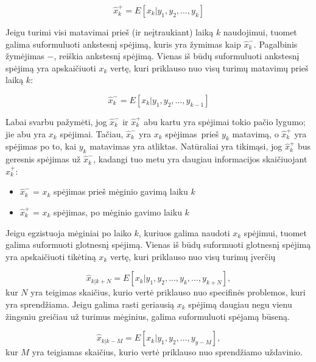     \begin{equation}
        \hat{x}_k^{+} = E[x_k|y_1,y_2, \dots , y_k]
    \end{equation}

    Jeigu turimi visi matavimai prieš (ir neįtraukiant) laiką $k$ naudojimui, tuomet galima suformuluoti ankstesnį spėjimą, kuris yra žymimas kaip $\hat{x}_k^{-}$.
    Pagalbinis žymėjimas $-$, reiškia ankstesnį spėjimą.
    Vienas iš būdų suformuluoti ankstesnį spėjimą yra apskaičiuoti $x_k$ vertę, kuri priklauso nuo visų turimų matavimų prieš laiką $k$:

    \begin{equation}
        \hat{x}_k^{-} = E[x_k|y_1,y_2,\dots, y_{k-1}]
    \end{equation}

    Labai svarbu pažymėti, jog $\hat{x}^-_k$ ir $\hat{x}_k^{+}$ abu kartu yra spėjimai tokio pačio lygumo; jie abu yra $x_k$ spėjimai.
    Tačiau, $\hat{x}_k^-$ yra $x_k$ spėjimas prieš $y_k$ matavimą, o $\hat{x}_k^+$ yra spėjimas po to, kai $y_k$ matavimas yra atliktas.
    Natūraliai yra tikimąsi, jog $\hat{x}_k^+$ bus geresnis spėjimas už $\hat{x}_k^-$, kadangi tuo metu yra daugiau informacijos skaičiuojant $\hat{x}_k^+$:

    \begin{itemize}
        \item $\hat{x}_k^-$ = $x_k$ spėjimas prieš mėginio gavimą laiku $k$
        \item $\hat{x}_k^+$ = $x_k$ spėjimas, po mėginio gavimo laiku $k$
    \end{itemize}

    Jeigu egzistuoja mėginiai po laiko $k$, kuriuos galima naudoti $x_k$ spėjimui, tuomet galima suformuoti glotnesnį spėjimą.
    Vienas iš būdų suformuoti glotnesnį spėjimą yra apskaičiuoti tikėtiną $x_k$ vertę, kuri priklauso nuo visų turimų įverčių

    \begin{equation}
        \hat{x}_{k|k+N} = E[x_k|y_1,y_2,\dots,y_k,\dots, y_{k+N}],
    \end{equation}
    kur $N$ yra teigimas skaičius, kurio vertė priklauso nuo specifinės problemos, kuri yra sprendžiama.
    Jeigu galima rasti geriausią $x_k$ spėjimą daugiau negu vienu žingsniu greičiau už turimus mėginius, galima suformuluoti spėjamą būseną.

    \begin{equation}
        \hat{x}_{k|k-M} = E[x_k|y_1,y_2, \dots, y_{y-M}],
    \end{equation}
    kur $M$ yra teigiamas skaičius, kurio vertė priklauso nuo sprendžiamo uždavinio.

